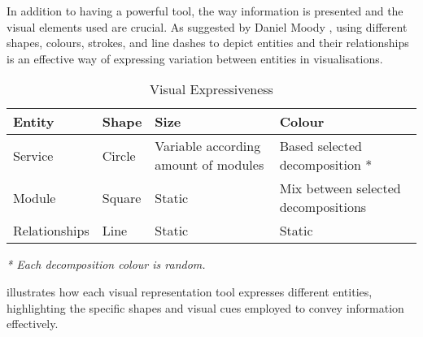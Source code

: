 In addition to having a powerful tool, the way information is presented and the
visual elements used are crucial. As suggested by Daniel Moody
\cite{moody2009physics}, using different shapes, colours, strokes, and line
dashes to depict entities and their relationships is an effective way of
expressing variation between entities in visualisations.


\begin{table}[!htb] \caption{Visual Expressiveness} \label{tab:visual_expressiveness}
  \begin{center}
    \begin{tabular}[c]{p{8em}|p{8em}|p{8em}|p{8em}}
      \textbf{Entity} &
      \textbf{Shape} &
      \textbf{Size} &
      \textbf{Colour} \\
      \hline Service & Circle & Variable according amount of modules & Based selected decomposition * \\
      \hline Module & Square & Static & Mix between selected decompositions \\
      \hline Relationships & Line & Static & Static \\
    \end{tabular}
  \end{center}
 \vspace{1ex}
 {\raggedright \textit{* Each decomposition colour is random.} \par}
\end{table}

 illustrates how each visual representation
tool expresses different entities, highlighting the specific shapes and visual
cues employed to convey information effectively.


